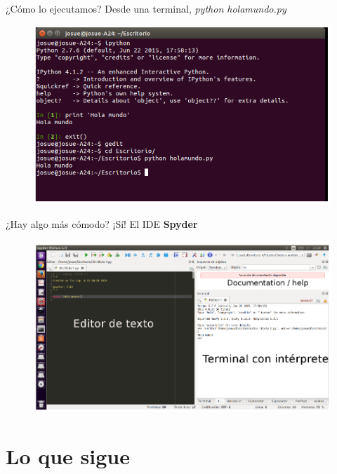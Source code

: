 \documentclass{beamer}
\begin{document}
\begin{frame}{¿Cómo lo ejecutamos?}
    Desde una terminal, \textit{python holamundo.py}
        \begin{figure}
    \centering
    \includegraphics[width=\textwidth]{fig/ejecutar_script.png}
    \end{figure}
\end{frame}

\begin{frame}{¿Hay algo más cómodo?}
    ¡Sí! El IDE \textbf{Spyder}
        \begin{figure}
    \centering
    \includegraphics[width=\textwidth]{fig/imagen_Spyder.png}
    \end{figure}
\end{frame}

\section{Lo que sigue}
\end{document}
